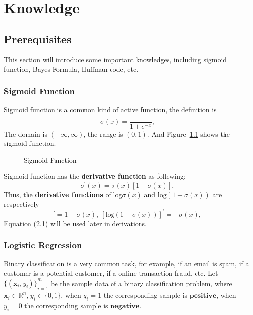 \chapter{Knowledge}
\label{cha:knowledgei}

\section{Prerequisites}
This section will introduce some important knowledges, including sigmoid function, Bayes Formula, Huffman code, etc.

\subsection{Sigmoid Function}
Sigmoid function is a common kind of active function, the definition is
$$ \sigma(x) = \frac{1}{1+e^{-x}}, $$
The domain is $(-\infty, \infty)$, the range is $(0,1)$. And Figure~\ref{fig:sigmoid} shows the sigmoid function.
\begin{figure}[!ht]
  \centering
	\caption{Sigmoid Function}
	\label{fig:sigmoid}
\end{figure}

Sigmoid function has the \textbf{derivative function} as following:
$$ \sigma^\prime(x) = \sigma(x)[1-\sigma(x)], $$
Thus, the \textbf{derivative functions} of $\mathrm{log}\sigma(x)$ and $\mathrm{log}(1-\sigma(x))$ are respectively
\begin{equation} 
[\mathrm{log}\sigma(x)]^\prime = 1-\sigma(x), \ [\mathrm{log}(1-\sigma(x))]^\prime = -\sigma(x), 
\end{equation}
Equation (2.1) will be used later in derivations.

\subsection{Logistic Regression}
Binary classification is a very common task, for example, if an email is spam, if a customer is a potential customer, if a online transaction fraud, etc. Let ${\{(\mathbf{x}_i,y_i)\}}^m_{i=1}$ be the sample data of a binary classification problem, where $\mathbf{x}_i \in \mathbb{R}^n$, $y_i \in \{0,1\}$, when $y_i = 1$ the corresponding sample is $\mathbf{positive}$, when $y_i = 0$ the corresponding sample is $\mathbf{negative}$.

